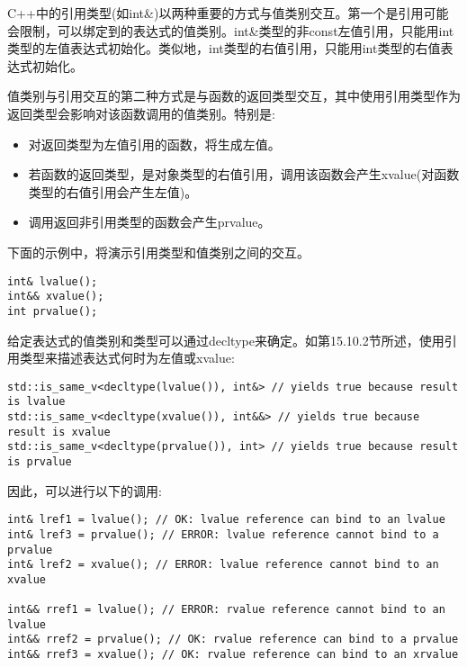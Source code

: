 C++中的引用类型(如int\&)以两种重要的方式与值类别交互。第一个是引用可能会限制，可以绑定到的表达式的值类别。int\&类型的非const左值引用，只能用int类型的左值表达式初始化。类似地，int类型的右值引用，只能用int类型的右值表达式初始化。

值类别与引用交互的第二种方式是与函数的返回类型交互，其中使用引用类型作为返回类型会影响对该函数调用的值类别。特别是:

\begin{itemize}
\item 
对返回类型为左值引用的函数，将生成左值。

\item 
若函数的返回类型，是对象类型的右值引用，调用该函数会产生xvalue(对函数类型的右值引用会产生左值)。

\item 
调用返回非引用类型的函数会产生prvalue。
\end{itemize}

下面的示例中，将演示引用类型和值类别之间的交互。

\begin{lstlisting}[style=styleCXX]
int& lvalue();
int&& xvalue();
int prvalue();
\end{lstlisting}

给定表达式的值类别和类型可以通过decltype来确定。如第15.10.2节所述，使用引用类型来描述表达式何时为左值或xvalue:

\begin{lstlisting}[style=styleCXX]
std::is_same_v<decltype(lvalue()), int&> // yields true because result is lvalue
std::is_same_v<decltype(xvalue()), int&&> // yields true because result is xvalue
std::is_same_v<decltype(prvalue()), int> // yields true because result is prvalue
\end{lstlisting}

因此，可以进行以下的调用:

\begin{lstlisting}[style=styleCXX]
int& lref1 = lvalue(); // OK: lvalue reference can bind to an lvalue
int& lref3 = prvalue(); // ERROR: lvalue reference cannot bind to a prvalue
int& lref2 = xvalue(); // ERROR: lvalue reference cannot bind to an xvalue

int&& rref1 = lvalue(); // ERROR: rvalue reference cannot bind to an lvalue
int&& rref2 = prvalue(); // OK: rvalue reference can bind to a prvalue
int&& rref3 = xvalue(); // OK: rvalue reference can bind to an xrvalue
\end{lstlisting}
















